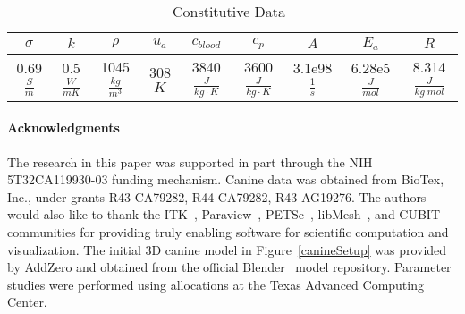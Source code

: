 \documentclass{article}
\begin{document}
\begin{table}[h]
\caption{Constitutive Data~\cite{Handbook05,stauffer2003paa,mcnichols2004mtb}}\label{modeldata}
\centering
\begin{tabular}{|c|c|c|c|c|c|c|c|c|} \hline
$\sigma$  &  $k$   &  $\rho$                &  $u_a$       &
$c_{blood}$                  &  $c_p$  & $A$ & $E_a$  & $R$  \\ \hline
 0.69 $\frac{S}{m}$  &  0.5  $\frac{W}{m K}$ &  1045 $\frac{kg}{m^3}$ &  308  $K$    &  3840 $ \frac{J}{kg \cdot K}$ &  3600 $ \frac{J}{kg \cdot K}$ 
  &  3.1e98 $ \frac{1}{s}$ &  6.28e5 $ \frac{J}{mol}$ &8.314 $\frac{J}{kg \; mol}$ \\ \hline
\end{tabular}
\end{table}


\paragraph{Acknowledgments}
The research in this paper was supported in part through the NIH
5T32CA119930-03 funding mechanism.  Canine data was obtained from
BioTex, Inc., under grants R43-CA79282, R44-CA79282, R43-AG19276.
The authors would also like to thank the
ITK~\cite{ITKSoftwareGuideSecondEdition}, Paraview~\cite{Paraview},
PETSc~\cite{petsc-manual}, libMesh~\cite{libMesh}, and
CUBIT~\cite{cubit} communities for providing truly enabling
software for scientific computation and visualization.  The initial
3D canine model in Figure~\ref{canineSetup} was provided by AddZero
and obtained from the official
Blender~\cite{roosendaal2000official} model repository.  Parameter
studies were performed using allocations  at the Texas Advanced
Computing Center. 

%


\end{document}
